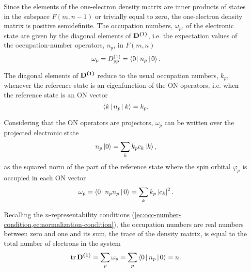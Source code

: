 Since the elements of the one-electron density matrix are inner products of 
states in the subspace $F\left( m, n-1 \right)$ or trivially equal to zero, 
the one-electron density matrix is positive semidefinite.
The occupation numbers, $\omega_p$, of the electronic state are given by the
diagonal elements of $ \mat{\oedm}$, i.e. the expectation values of the 
occupation-number operators, $n_p$, in $F\left( m,n \right)$
\begin{equation}
    \omega_p = \oedm_{pp} = \Braket{0 | n_p | 0}
    .
\end{equation}

The diagonal elements of $ \mat{\oedm}$ reduce to the usual occupation numbers,
$k_p$, whenever the reference state is an eigenfunction of the ON operators, i.e.
when the reference state is an ON vector 
\begin{equation}
    \Braket{k | n_p | k} = k_p
    .
\end{equation}

Considering that the ON operators are projectors, $\omega_p$ can be written 
over the projected electronic state 
\begin{equation}
    n_p \Ket{0} = \sum_{k} k_p c_k \Ket{k}
    ,
\end{equation}
as 
the squared norm of the part of the reference state where the spin orbital
$\varphi_p$ is occupied in each ON vector
\begin{equation}
    \omega_p =
    \Braket{0 | n_p n_p | 0} =
    \sum_{k} k_p \left| c_k \right|^2
    .
\end{equation}

Recalling the $n$-representability conditions 
(\cref{ec:occ-number-condition,ec:normalization-condition}),
the occupation numbers are real numbers between zero and one 
and its sum, the trace of the density matrix, is equal to the total number
of electrons in the system 
\begin{equation}
    \trace \mat{\oedm} =
    \sum_{p} \omega_p =
    \sum_{p} \Braket{0 | n_p | 0} =
    n
    .
\end{equation}

